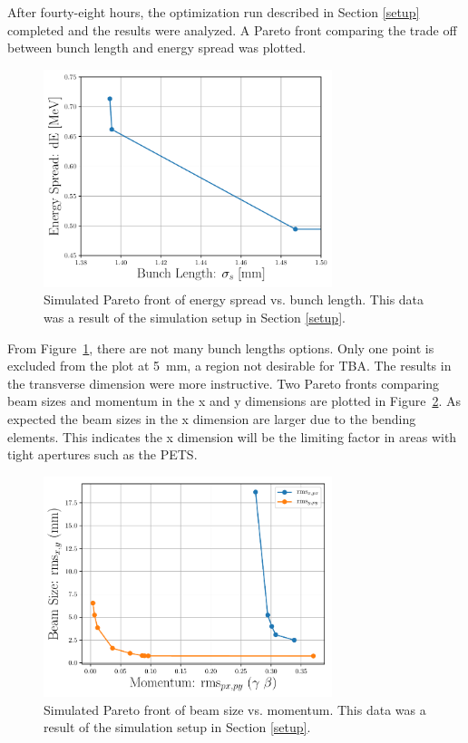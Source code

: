 After fourty-eight hours, the optimization run described in Section \ref{setup}
completed and the results were analyzed. 
A Pareto front comparing the trade off between bunch length and energy spread was plotted.
\begin{figure}
	\centering
	\includegraphics[width=0.75\textwidth]{./images/dE_vs_zrms_pareto_front_quads_before_Q5}
	\caption{Simulated Pareto front of energy spread vs. bunch length.
	This data was a result of the simulation setup in Section \ref{setup}.}
\label{fig:tba-pareto}
\end{figure}
From Figure~\ref{fig:tba-pareto}, there are not many bunch lengths options.
Only one point is excluded from the plot at \SI{5}{mm}, a region 
not desirable for TBA. The results in the transverse dimension were
more instructive. Two Pareto fronts comparing beam sizes
and momentum in the x and y dimensions are plotted in Figure~\ref{fig:tba-paretoxy}.
As expected the beam sizes in the x dimension are larger 
due to the bending elements. This indicates the x dimension will be the 
limiting factor in areas with tight apertures such as the PETS.
\iftrue
\begin{figure}
	\centering
	\includegraphics[width=0.75\textwidth]{./images/xy_vs_pxy_pareto_front_quads_before_Q5}
	\caption{Simulated Pareto front of beam size vs. momentum.
		This data was a result of the simulation setup in Section \ref{setup}.}
	\label{fig:tba-paretoxy}
\end{figure}
